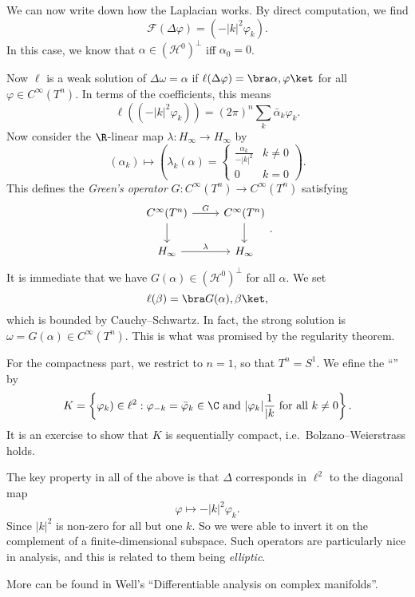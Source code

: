 \documentclass[a4paper]{article}
\begin{document}
\begin{eg}
  We can now write down how the Laplacian works. By direct computation, we find
  \[
    \mathcal{F}(\Delta \varphi) = (-|k|^2 \varphi_k).
  \]
  In this case, we know that $\alpha \in (\mathcal{H}^0)^\perp$ iff $\alpha_0 = 0$.

  Now $\ell$ is a weak solution of $\Delta \omega = \alpha$ if $\ell(\Delta \varphi) = \bra \alpha, \varphi\ket$ for all $\varphi \in C^\infty(T^n)$. In terms of the coefficients, this means
  \[
    \ell((-|k|^2 \varphi_k)) = (2\pi)^n \sum_k \bar{\alpha}_k \varphi_k.
  \]
  Now consider the $\R$-linear map $\lambda: H_\infty\to H_\infty$ by
  \[
    (\alpha_k) \mapsto \left(\lambda_k(\alpha) =
    \begin{cases}
      \frac{\alpha_k}{-|k|^2} & k \not= 0\\
      0 & k = 0
    \end{cases}\right).
  \]
  This defines the \emph{Green's operator} $G: C^\infty(T^n) \to C^\infty(T^n)$ satisfying
  \[
    \begin{tikzcd}
      C^\infty(T^n) \ar[r, "G"] \ar[d] & C^\infty(T^n) \ar[d]\\
      H_\infty \ar[r, "\lambda"] & H_\infty
    \end{tikzcd}.
  \]
  It is immediate that we have $G(\alpha) \in (\mathcal{H}^0)^\perp$ for all $\alpha$. We set
  \[
    \ell(\beta) = \bra G(\alpha), \beta\ket,
  \]
  which is bounded by Cauchy--Schwartz. In fact, the strong solution is $\omega = G(\alpha) \in C^\infty(T^n)$. This is what was promised by the regularity theorem.

  For the compactness part, we restrict to $n = 1$, so that $T^n = S^1$. We efine the ``'' by
  \[
    K = \left\{\varphi_k) \in \ell^2: \varphi_{-k} = \bar{\varphi}_k \in \C\text{ and }|\varphi_k| \frac{1}{|k}\text{ for all }k \not= 0\right\}.
  \]
  It is an exercise to show that $K$ is sequentially compact, i.e.\ Bolzano--Weierstrass holds.
\end{eg}

The key property in all of the above is that $\Delta$ corresponds in $\ell^2$ to the diagonal map
\[
  \varphi \mapsto -|k|^2 \varphi_k.
\]
Since $|k|^2$ is non-zero for all but one $k$. So we were able to invert it on the complement of a finite-dimensional subspace. Such operators are particularly nice in analysis, and this is related to them being \emph{elliptic}.

More can be found in Well's ``Differentiable analysis on complex manifolds''.
\end{document}

